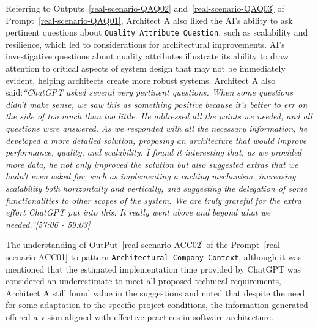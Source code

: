 Referring to Outputs~\ref{real-scenario-QAQ02} and~\ref{real-scenario-QAQ03} of Prompt~\ref{real-scenario-QAQ01}, Architect A also liked the AI's ability to ask pertinent questions about \texttt{Quality Attribute Question}, such as scalability and resilience, which led to considerations for architectural improvements. AI's investigative questions about quality attributes illustrate its ability to draw attention to critical aspects of system design that may not be immediately evident, helping architects create more robust systems. Architect A also said:\textit{``ChatGPT asked several very pertinent questions. When some questions didn't make sense, we saw this as something positive because it's better to err on the side of too much than too little. He addressed all the points we needed, and all questions were answered. As we responded with all the necessary information, he developed a more detailed solution, proposing an architecture that would improve performance, quality, and scalability. I found it interesting that, as we provided more data, he not only improved the solution but also suggested extras that we hadn't even asked for, such as implementing a caching mechanism, increasing scalability both horizontally and vertically, and suggesting the delegation of some functionalities to other scopes of the system. We are truly grateful for the extra effort ChatGPT put into this. It really went above and beyond what we needed.''[57:06 - 59:03]}



The understanding of OutPut~\ref{real-scenario-ACC02} of the Prompt~\ref{real-scenario-ACC01} to pattern \texttt{Architectural Company Context}, although it was mentioned that the estimated implementation time provided by ChatGPT was considered an underestimate to meet all proposed technical requirements, Architect A still found value in the suggestions and noted that despite the need for some adaptation to the specific project conditions, the information generated offered a vision aligned with effective practices in software architecture.



